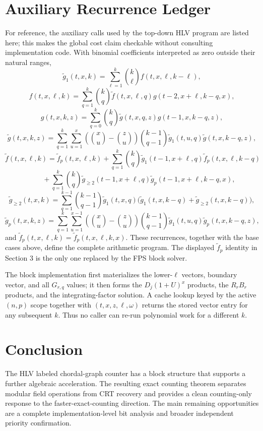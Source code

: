 \documentclass[10pt]{article}
\begin{document}
\section{Auxiliary Recurrence Ledger}
For reference, the auxiliary calls used by the top-down HLV program are listed here; this makes the global cost claim checkable without consulting implementation code. With binomial coefficients interpreted as zero outside their natural ranges,
\[
\widetilde g_1(t,x,k)=\sum_{\ell=1}^{k}\binom{k}{\ell}f(t,x,\ell,k-\ell),
\]
\[
f(t,x,\ell,k)=\sum_{q=1}^{k}\binom{k}{q}\widetilde f(t,x,\ell,q)g(t-2,x+\ell,k-q,x),
\]
\[
g(t,x,k,z)=\sum_{q=0}^{k}\binom{k}{q}\widetilde g(t,x,q,z)g(t-1,x,k-q,z),
\]
\[
\widetilde g(t,x,k,z)=\sum_{q=1}^{k}\sum_{u=1}^{x}\left(\binom{x}{u}-\binom{z}{u}\right)\binom{k-1}{q-1}\widetilde g_1(t,u,q)\widetilde g(t,x,k-q,z),
\]
\[
\widetilde f(t,x,\ell,k)=\widetilde f_p(t,x,\ell,k)+\sum_{q=1}^{k}\binom{k}{q}\widetilde g_1(t-1,x+\ell,q)\widetilde f_p(t,x,\ell,k-q)
\]
\[
\qquad+\sum_{q=1}^{k}\binom{k}{q}\widetilde g_{\ge2}(t-1,x+\ell,q)\widetilde g_p(t-1,x+\ell,k-q,x),
\]
\[
\widetilde g_{\ge2}(t,x,k)=\sum_{q=1}^{k-1}\binom{k-1}{q-1}\widetilde g_1(t,x,q)\bigl(\widetilde g_1(t,x,k-q)+\widetilde g_{\ge2}(t,x,k-q)\bigr),
\]
\[
\widetilde g_p(t,x,k,z)=\sum_{q=1}^{k}\sum_{u=1}^{x-1}\left(\binom{x}{u}-\binom{z}{u}\right)\binom{k-1}{q-1}\widetilde g_1(t,u,q)\widetilde g_p(t,x,k-q,z),
\]
and $\widetilde f_p(t,x,\ell,k)=\widetilde f_p(t,x,\ell,k,x)$. These recurrences, together with the base cases above, define the complete arithmetic program. The displayed $\widetilde f_p$ identity in Section 3 is the only one replaced by the FPS block solver.

The block implementation first materializes the lower-$\ell$ vectors, boundary vector, and all $G_{r,q}$ values; it then forms the $D_j(1+U)^x$ products, the $R_rB_r$ products, and the integrating-factor solution. A cache lookup keyed by the active $(n,p)$ scope together with $(t,x,z,\ell,\omega)$ returns the stored vector entry for any subsequent $k$. Thus no caller can re-run polynomial work for a different $k$.

\section{Conclusion}
The HLV labeled chordal-graph counter has a block structure that supports a further algebraic acceleration. The resulting exact counting theorem separates modular field operations from CRT recovery and provides a clean counting-only response to the faster-exact-counting direction. The main remaining opportunities are a complete implementation-level bit analysis and broader independent priority confirmation.



\end{document}
